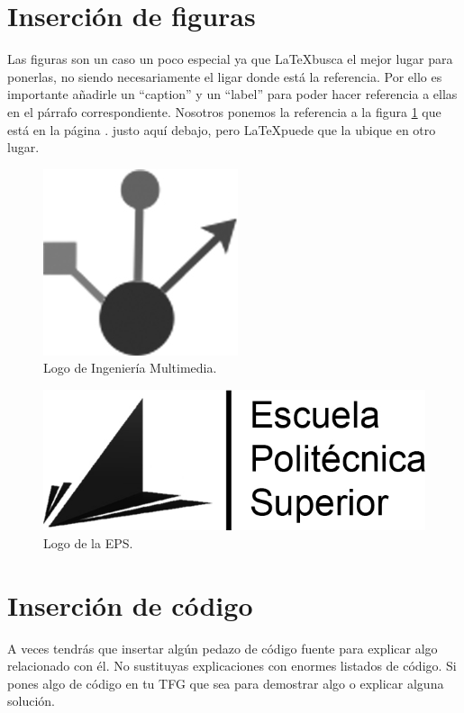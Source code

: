 \section{Inserción de figuras}

Las figuras son un caso un poco especial ya que \LaTeX busca el mejor lugar para ponerlas, no siendo necesariamente el ligar donde está la referencia. Por ello es importante añadirle un ``caption'' y un ``label'' para poder hacer referencia a ellas en el párrafo correspondiente. Nosotros ponemos la referencia a la figura \ref{logo_im} que está en la página \pageref{logo_im}. justo aquí debajo, pero \LaTeX puede que la ubique en otro lugar.

\begin{figure}
\begin{center}
\includegraphics[scale=0.25]{imagenes/logoim.jpg}
\caption{Logo de Ingeniería  Multimedia.}
\label{logo_im}
\end{center}
\end{figure}

\begin{figure}
\begin{center}
\includegraphics[scale=0.25]{imagenes/logoeps.jpg}
\caption{Logo de la EPS.}
\label{logo_eps}
\end{center}
\end{figure}

\section{Inserción de código}
A veces tendrás que insertar algún pedazo de código fuente para explicar algo relacionado con él. No sustituyas explicaciones con enormes listados de código. Si pones algo de código en tu TFG que sea para demostrar algo o explicar alguna solución.


